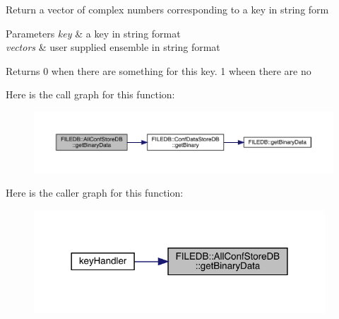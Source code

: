 Return a vector of complex numbers corresponding to a key in string form 
\begin{DoxyParams}{Parameters}
{\em key} & a key in string format \\
\hline
{\em vectors} & user supplied ensemble in string format \\
\hline
\end{DoxyParams}
\begin{DoxyReturn}{Returns}
0 when there are something for this key. 1 wheen there are no 
\end{DoxyReturn}
Here is the call graph for this function\+:
\nopagebreak
\begin{figure}[H]
\begin{center}
\leavevmode
\includegraphics[width=350pt]{df/db6/classFILEDB_1_1AllConfStoreDB_aa923faf368f0aa7d327c2a3702d261c1_cgraph}
\end{center}
\end{figure}
Here is the caller graph for this function\+:
\nopagebreak
\begin{figure}[H]
\begin{center}
\leavevmode
\includegraphics[width=309pt]{df/db6/classFILEDB_1_1AllConfStoreDB_aa923faf368f0aa7d327c2a3702d261c1_icgraph}
\end{center}
\end{figure}
\mbox{\label{classFILEDB_1_1AllConfStoreDB_a351639b9e19297abfa7b8b1aca013770}} 
